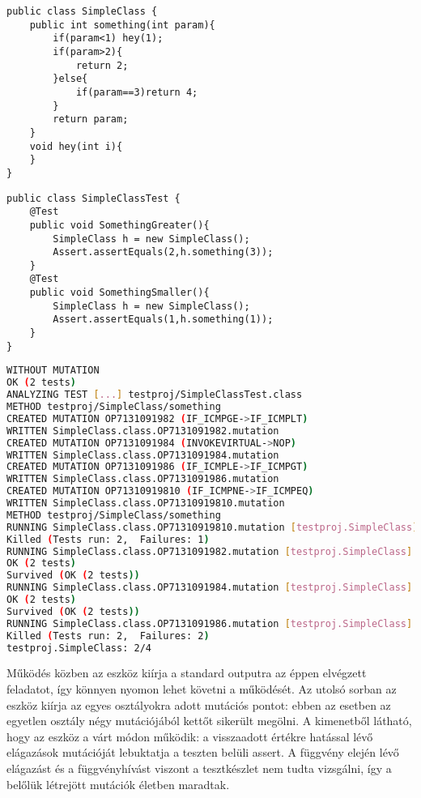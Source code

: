 \begin{lstlisting}[frame=single,float=!ht,caption={Simple Class},captionpos=b,label={lst:simpleclass}]
public class SimpleClass {
    public int something(int param){
        if(param<1) hey(1);
        if(param>2){
            return 2;
        }else{
            if(param==3)return 4;
        }
        return param;
    }
    void hey(int i){
    }
}
\end{lstlisting}
\begin{lstlisting}[frame=single,float=!ht,caption={Simple Class Test},captionpos=b,label={lst:simpleclasstest}]
public class SimpleClassTest {
    @Test
    public void SomethingGreater(){
        SimpleClass h = new SimpleClass();
        Assert.assertEquals(2,h.something(3));
    }
    @Test
    public void SomethingSmaller(){
        SimpleClass h = new SimpleClass();
        Assert.assertEquals(1,h.something(1));
    }
}
\end{lstlisting}
\begin{lstlisting}[frame=single,float=!ht,caption={Az eszköz kimenete erre a programra},captionpos=b,label={lst:simpleclass_run},language=bash]
WITHOUT MUTATION
OK (2 tests)
ANALYZING TEST [...] testproj/SimpleClassTest.class
METHOD testproj/SimpleClass/something
CREATED MUTATION OP7131091982 (IF_ICMPGE->IF_ICMPLT)
WRITTEN SimpleClass.class.OP7131091982.mutation
CREATED MUTATION OP7131091984 (INVOKEVIRTUAL->NOP)
WRITTEN SimpleClass.class.OP7131091984.mutation
CREATED MUTATION OP7131091986 (IF_ICMPLE->IF_ICMPGT)
WRITTEN SimpleClass.class.OP7131091986.mutation
CREATED MUTATION OP71310919810 (IF_ICMPNE->IF_ICMPEQ)
WRITTEN SimpleClass.class.OP71310919810.mutation
METHOD testproj/SimpleClass/something
RUNNING SimpleClass.class.OP71310919810.mutation [testproj.SimpleClass]
Killed (Tests run: 2,  Failures: 1)
RUNNING SimpleClass.class.OP7131091982.mutation [testproj.SimpleClass]
OK (2 tests)
Survived (OK (2 tests))
RUNNING SimpleClass.class.OP7131091984.mutation [testproj.SimpleClass]
OK (2 tests)
Survived (OK (2 tests))
RUNNING SimpleClass.class.OP7131091986.mutation [testproj.SimpleClass]
Killed (Tests run: 2,  Failures: 2)
testproj.SimpleClass: 2/4
\end{lstlisting}
Működés közben az eszköz kiírja a standard outputra az éppen elvégzett feladatot, így könnyen nyomon lehet követni a működését. Az utolsó sorban az eszköz kiírja az egyes osztályokra adott mutációs pontot: ebben az esetben az egyetlen osztály négy mutációjából kettőt sikerült megölni. A kimenetből látható, hogy az eszköz a várt módon működik: a visszaadott értékre hatással lévő elágazások mutációját lebuktatja a teszten belüli assert. A függvény elején lévő elágazást és a függvényhívást viszont a tesztkészlet nem tudta vizsgálni, így a belőlük létrejött mutációk életben maradtak. 
